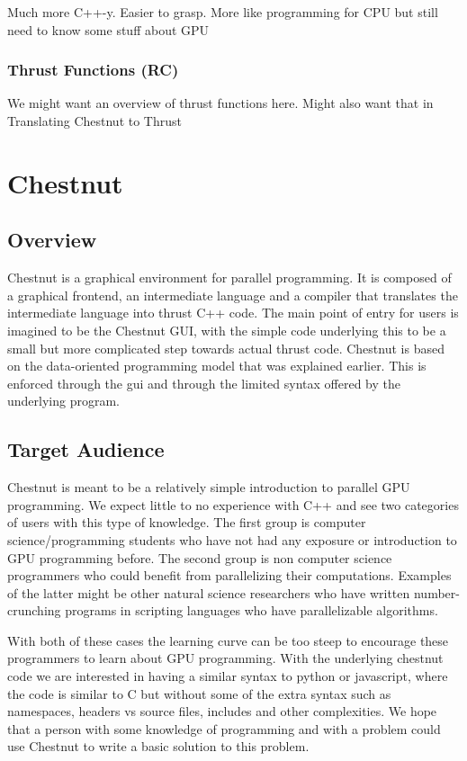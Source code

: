 \documentclass[twocolumn]{article}
\renewcommand{\|}{\origbar} %
\begin{document}
Much more C++-y. Easier to grasp. More like programming for CPU but still need to know some stuff about GPU

\subsubsection{Thrust Functions (RC)}

We might want an overview of thrust functions here. Might also want that in Translating Chestnut to Thrust

\section{Chestnut}

\subsection{Overview}

Chestnut is a graphical environment for parallel programming. It is composed of a graphical frontend, an intermediate language and a compiler that translates the intermediate language into thrust C++ code. The main point of entry for users is imagined to be the Chestnut GUI, with the simple code underlying this to be a small but more complicated step towards actual thrust code. Chestnut is based on the data-oriented programming model that was explained earlier. This is enforced through the gui and through the limited syntax offered by the underlying program.

\subsection{Target Audience}

Chestnut is meant to be a relatively simple introduction to parallel GPU programming. We expect little to no experience with C++ and see two categories of users with this type of knowledge. The first group is computer science/programming students who have not had any exposure or introduction to GPU programming before. The second group is non computer science programmers who could benefit from parallelizing their computations. Examples of the latter might be other natural science researchers who have written number-crunching programs in scripting languages who have parallelizable algorithms.

With both of these cases the learning curve can be too steep to encourage these programmers to learn about GPU programming. With the underlying chestnut code we are interested in having a similar syntax to python or javascript, where the code is similar to C but without some of the extra syntax such as namespaces, headers vs source files, includes and other complexities. We hope that a person with some knowledge of programming and with a problem could use Chestnut to write a basic solution to this problem.
\end{document}

